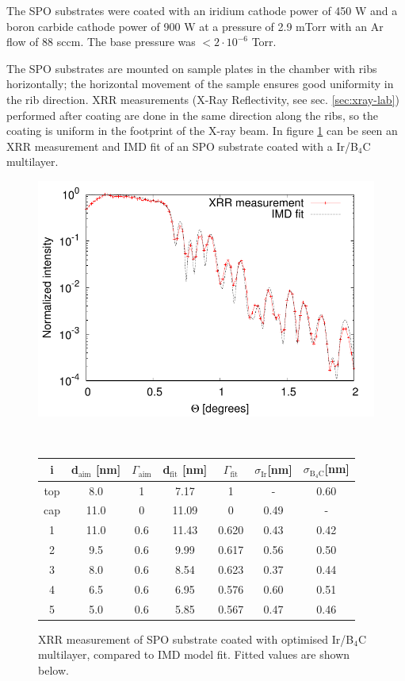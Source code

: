The SPO substrates were coated with an iridium cathode power of 450 W and a boron carbide cathode power of 900 W at a pressure of 2.9 mTorr with an Ar flow of 88 sccm. The base pressure was $< 2\cdot10^{-6}$ Torr.

The SPO substrates are mounted on sample plates in the chamber with ribs horizontally; the horizontal movement of the sample ensures good uniformity in the rib direction. XRR measurements (X-Ray Reflectivity, see sec. \ref{sec:xray-lab}) performed after coating are done in the same direction along the ribs, so the coating is uniform in the footprint of the X-ray beam. In figure \ref{fig:ir-b4c-fit} can be seen an XRR measurement and IMD fit of an SPO substrate coated with a  Ir/B$_4$C multilayer.

\begin{figure}[h!]
\centering
\begin{minipage}{.6\textwidth}
  \centering
  \includegraphics[width=\linewidth]{figures/athena/coating_on_spo/120-10-21_fit.pdf}
\end{minipage}
\\
\vspace{1cm}
\begin{minipage}{.8\textwidth}
  \centering
  \footnotesize
\begin{tabular}{c|c|c|c|c|c|c}
i&d$_{\text{aim}}$ [nm]&$\Gamma_{\text{aim}}$&d$_{\text{fit}}$ [nm]&$\Gamma_{\text{fit}}$&$\sigma_{\text{Ir}}$[nm]&$\sigma_{\text{B}_4\text{C}}$[nm]\\
\hline
top&8.0&1&7.17&1&-&0.60\\
cap&11.0&0&11.09&0&0.49&-\\
1&11.0&0.6&11.43&0.620&0.43&0.42\\
2&9.5&0.6&9.99&0.617&0.56&0.50\\
3&8.0&0.6&8.54&0.623&0.37&0.44\\
4&6.5&0.6&6.95&0.576&0.60&0.51\\
5&5.0&0.6&5.85&0.567&0.47&0.46
\end{tabular}
\end{minipage}
\caption{\footnotesize XRR measurement of SPO substrate coated with optimised Ir/B$_4$C multilayer, compared to IMD model fit. Fitted values are shown below.}\label{fig:ir-b4c-fit}
\end{figure}


